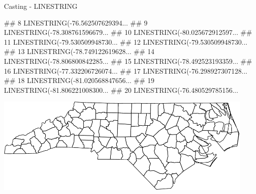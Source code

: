 \documentclass[11pt,ignorenonframetext,]{beamer}
\newenvironment{Shaded}{}{}
\newcommand{\KeywordTok}[1]{\textcolor[rgb]{0.00,0.44,0.13}{\textbf{#1}}}
\newcommand{\StringTok}[1]{\textcolor[rgb]{0.25,0.44,0.63}{#1}}
\newcommand{\OperatorTok}[1]{\textcolor[rgb]{0.40,0.40,0.40}{#1}}
\newcommand{\NormalTok}[1]{#1}
\let\oldShaded\Shaded
\let\endoldShaded\endShaded
\renewenvironment{Shaded}{\footnotesize\begin{spacing}{0.9}\oldShaded}{\endoldShaded\end{spacing}}
\let\oldverbatim\verbatim
\let\endoldverbatim\endverbatim
\newcommand{\scriptoutput}{
  \renewenvironment{Shaded}{\scriptsize\begin{spacing}{0.9}\oldShaded}{\endoldShaded\end{spacing}}
  \renewenvironment{verbatim}{\scriptsize\begin{spacing}{0.9}\oldverbatim}{\endoldverbatim\end{spacing}}
}
\begin{document}
\begin{frame}[fragile,t]{Casting - LINESTRING}
\begin{Shaded}
\begin{Highlighting}[]
\NormalTok{## 8  LINESTRING(-76.562507629394...}
\NormalTok{## 9  LINESTRING(-78.308761596679...}
\NormalTok{## 10 LINESTRING(-80.025672912597...}
\NormalTok{## 11 LINESTRING(-79.530509948730...}
\NormalTok{## 12 LINESTRING(-79.530509948730...}
\NormalTok{## 13 LINESTRING(-78.749122619628...}
\NormalTok{## 14 LINESTRING(-78.806800842285...}
\NormalTok{## 15 LINESTRING(-78.492523193359...}
\NormalTok{## 16 LINESTRING(-77.332206726074...}
\NormalTok{## 17 LINESTRING(-76.298927307128...}
\NormalTok{## 18 LINESTRING(-81.020568847656...}
\NormalTok{## 19 LINESTRING(-81.806221008300...}
\NormalTok{## 20 LINESTRING(-76.480529785156...}
\end{Highlighting}
\end{Shaded}

\end{frame}

\begin{frame}[fragile,t]{}

\scriptoutput

\begin{Shaded}
\end{Shaded}

\begin{center}\includegraphics[width=0.95\textwidth]{Lec17_files/figure-beamer/unnamed-chunk-19-1} \end{center}

\end{frame}
\end{document}
